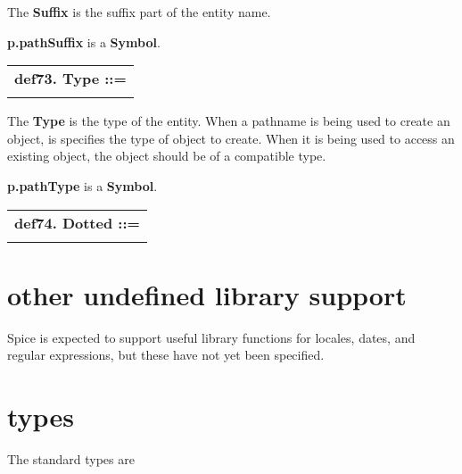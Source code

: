 \documentclass{report}
\begin{document}
The {\bf Suffix} is the suffix part of the entity name.

{\bf p.pathSuffix} is a {\bf Symbol}.

\begin{tabular}{l}
{\bf def73. Type ::= }\\ 
\hspace*{3mm}{\tt ";" Word} \\ 
\end{tabular}

The {\bf Type} is the type of the entity. When a pathname is being used to create
an object, is specifies the type of object to create. When it is being used
to access an existing object, the object should be of a compatible type.

{\bf p.pathType} is a {\bf Symbol}.

\begin{tabular}{l}
{\bf def74. Dotted ::= }\\ 
\hspace*{3mm}{\tt Word++ "."} \\ 
\end{tabular}

\section{other undefined library support}


Spice is expected to support useful library functions for locales, dates, and
regular expressions, but these have not yet been specified.\section{types}


The standard types are
\end{document}

